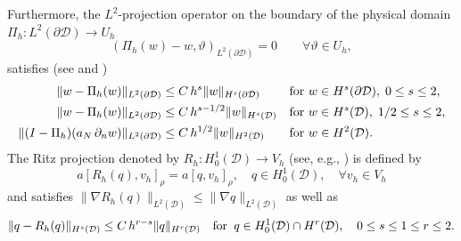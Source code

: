\documentclass[a4paper,10pt]{article}
\newcommand{\cD}{{\mathcal{D}}}
\numberwithin{theorem}{section}
\begin{document}
Furthermore, the $L^2$-projection operator on the boundary of the physical domain  $\Pi_h\colon L^2(\partial \cD) \rightarrow U_h$ 
\begin{equation}\label{eq:l2_proj_u}
    (\Pi_h(w)   - w, \vartheta)_{L^2(\partial \cD)} = 0  \qquad \forall  \vartheta \in U_h,
\end{equation}
satisfies (see \cite{PGCiarlet_1978a} and \cite{DAFrench_JTKing_1993})
\begin{subequations}\label{ineq:l2_projection}
    \begin{align}
        \|w -\Pi_h(w)\|_{L^2(\partial \cD)} &\leq C \, h^{s} \|w\|_{H^s(\partial \cD)} && \hbox{for}\ w \in H^s(\partial \cD), \; 0 \leq s \leq 2, \label{ineq:l2_projectiona} \\
        \|w -\Pi_h(w)\|_{L^2(\partial \cD)} &\leq C \, h^{s-1/2} \|w\|_{H^s(\cD)} && \hbox{for}\ w \in H^s(\cD), \; 1/2 \leq s \leq 2, \label{ineq:l2_projectionb} \\ 
        \|(I - \Pi_h)(a_N\,\partial_n w) \|_{L^2(\partial \cD)} &\leq C \, h^{1/2} \|w\|_{H^2(\cD)} && \hbox{for}\ w \in H^2(\cD).  \label{ineq:l2_projectionc}
    \end{align}
\end{subequations}
The Ritz projection denoted by $R_h: H^1_0(\cD) \rightarrow V_h$  (see, e.g., \cite[Sec. 3.1]{PGCiarlet_1978a}) is defined by
\begin{equation}\label{ritz_def}
 a[R_h(q), v_h]_{\rho} = a[q, v_h]_{\rho}, \quad  q \in H^1_0(\cD), \quad \forall   v_h \in V_h
\end{equation}
and satisfies $\| \nabla R_h(q)\|_{L^2(\cD)} \leq \| \nabla q\|_{L^2(\cD)}$ as well as
\begin{equation}\label{ritz_ineq}
 \| q -R_h(q)\|_{H^s(\cD)} \leq C \, h^{r -s} \|q\|_{H^r(\cD)} \quad  \hbox{for} \;\; q \in H^1_0(\cD) \cap H^r(\cD), \quad  0 \leq s \leq 1 \leq r \leq 2.
\end{equation}

\end{document}
